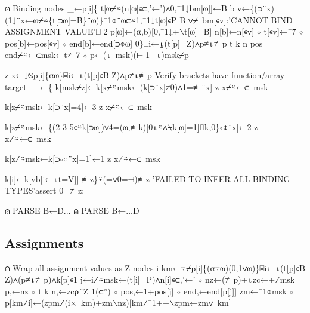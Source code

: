 \documentclass{article}%
\begin{document}
⍝ Binding nodes
_←p[i]\{
        t[⍵⌿⍨(n[⍵]∊⊂,'←')∧0,¯1↓bm[⍵]]←B
        b v←\{(⊃¨x)(1↓¨x←⍵⌿⍨\{t[⊃⍵]=B\}¨⍵)\}¯1⌽¨⍵⊂⍨1,¯1↓t[⍵]∊P B
        ∨⌿~bm[∊v]:'CANNOT BIND ASSIGNMENT VALUE'⎕ 2
        p[⍵]←(⍺,b)[0,¯1↓+⍀t[⍵]=B]
        n[b]←n[∊v] ⋄ t[∊v]←¯7 ⋄ pos[b]←pos[∊v] ⋄ end[b]←end[⊃⌽⍵]
0\}⌸i←⍸(t[p]=Z)∧p≠⍳≢p
t k n pos end⌿⍨←⊂msk←t≠¯7 ⋄ p←(⍸~msk)(⊢-1+⍸)msk⌿p
\nwendcode{}\nwdocspar

\nwenddocs{}\endmoddef\nwstartdeflinemarkup{}\nwenddeflinemarkup
z x←↓⍉p[i]\{⍺⍵\}⌸i←⍸(t[p]∊B Z)∧p≠⍳≢p
\LA{}Verify brackets have function/array target~{\nwtagstyle{}}\RA{}
_←\{
        k[msk⌿z]←k[x⌿⍨msk←(k[⊃¨x]≠0)∧1=≢¨x]
        z x⌿⍨←⊂~msk

        k[z⌿⍨msk←k[⊃¨x]=4]←3
        z x⌿⍨←⊂~msk

        k[z⌿⍨msk←\{(2 3 5∊⍨k[⊃⍵])∨4=(⍵,≢k)[0⍳⍨∧⍀k[⍵]=1]⌷k,0\}∘⌽¨x]←2
        z x⌿⍨←⊂~msk

        k[z⌿⍨msk←k[⊃∘⌽¨x]=1]←1
        z x⌿⍨←⊂~msk

        k[i]←k[vb[i←⍸t=V]]
≢z\}⍣(=∨0=⊣)≢z
'FAILED TO INFER ALL BINDING TYPES'assert 0=≢z:
\nwendcode{}\nwdocspar

\nwenddocs{}\endmoddef\nwstartdeflinemarkup{}\nwenddeflinemarkup
⍝ PARSE B←D...
⍝ PARSE B←...D
\nwendcode{}\nwdocspar

\subsection{Assignments}

\nwenddocs{}\endmoddef\nwstartdeflinemarkup{}\nwenddeflinemarkup
⍝ Wrap all assignment values as Z nodes
i km←⍪⌿p[i]\{(⍺⍪⍵)(0,1∨⍵)\}⌸i←⍸(t[p]∊B Z)∧(p≠⍳≢p)∧k[p]∊1
j←i⌿⍨msk←(t[i]=P)∧n[i]∊⊂,'←' ⋄ nz←(≢p)+⍳zc←+⌿msk
p,←nz ⋄ t k n,←zc⍴¨Z 1(⊂'') ⋄ pos,←1+pos[j] ⋄ end,←end[p[j]]
zm←¯1⌽msk ⋄ p[km⌿i]←(zpm⌿(i×~km)+zm⍀nz)[km⌿¯1++⍀zpm←zm∨~km]
\end{document}
